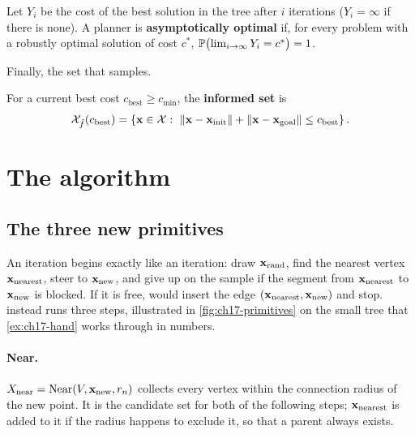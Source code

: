 \begin{definition}
\label{def:ch17-ao}
Let $Y_i$ be the cost of the best solution in the tree after $i$
iterations ($Y_i=\infty$ if there is none). A planner is
\textbf{asymptotically optimal} if, for every
problem with a robustly optimal solution of cost $c^*$,
$\mathbb{P}\bigl(\lim_{i\to\infty}Y_i=c^*\bigr)=1$.
\end{definition}

Finally, the set that \irrtstar samples.

\begin{definition}
\label{def:ch17-informed}
For a current best cost $c_{\mathrm{best}}\ge c_{\min}$, the
\textbf{informed set} is
\begin{equation}
  \mathcal{X}_{\hat f}(c_{\mathrm{best}})=\set{\state\in\mathcal{X}:\ \norm{\state-\state_{\mathrm{init}}}+\norm{\state-\state_{\mathrm{goal}}}\le c_{\mathrm{best}}}.
  \label{eq:ch17-informed-set}
\end{equation}
\end{definition}

\section{The algorithm}
\label{sec:ch17-algorithm}

\subsection{The three new primitives}
\label{sec:ch17-primitives}

An \rrtstar iteration begins exactly like an \rrt iteration: draw
$\mathbf{x}_{\mathrm{rand}}$, find the nearest vertex
$\mathbf{x}_{\mathrm{nearest}}$, steer to $\mathbf{x}_{\mathrm{new}}$, and give up on the sample if the segment from
$\mathbf{x}_{\mathrm{nearest}}$ to $\mathbf{x}_{\mathrm{new}}$ is blocked. If it is free,
\rrt would insert the edge $(\mathbf{x}_{\mathrm{nearest}},\mathbf{x}_{\mathrm{new}})$ and
stop. \rrtstar instead runs three steps, illustrated in
\cref{fig:ch17-primitives} on the small tree that \cref{ex:ch17-hand} works
through in numbers.

\paragraph{Near.} $X_{\mathrm{near}}=\operatorname{Near}(V,\mathbf{x}_{\mathrm{new}},r_n)$ collects
every vertex within the connection radius of the new point. It is the
candidate set for both of the following steps; $\mathbf{x}_{\mathrm{nearest}}$ is
added to it if the radius happens to exclude it, so that a parent always
exists.

